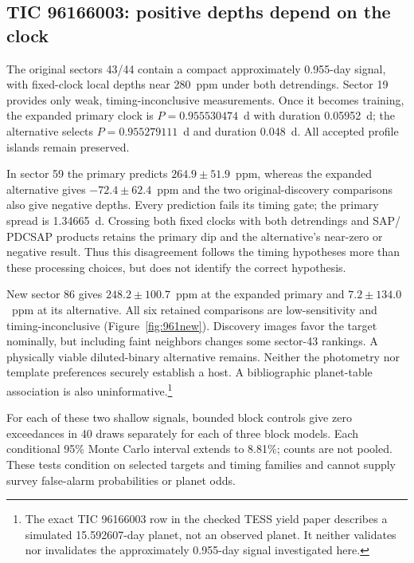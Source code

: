 \subsection{TIC 96166003: positive depths depend on the clock}
\label{sec:tic961}

The original sectors 43/44 contain a compact approximately 0.955-day signal,
with fixed-clock local depths near 280~ppm under both detrendings. Sector 19
provides only weak, timing-inconclusive measurements. Once it becomes training,
the expanded primary clock is $P=0.955530474$~d with duration 0.05952~d;
the alternative selects $P=0.955279111$~d and duration 0.048~d. All accepted
profile islands remain preserved.

In sector 59 the primary predicts $264.9\pm51.9$~ppm, whereas the expanded
alternative gives $-72.4\pm62.4$~ppm and the two original-discovery comparisons
also give negative depths. Every prediction fails its timing gate; the primary
spread is 1.34665~d. Crossing both fixed clocks with both detrendings and SAP/
PDCSAP products retains the primary dip and the alternative's near-zero or
negative result. Thus this disagreement follows the timing hypotheses more than
these processing choices, but does not identify the correct hypothesis.

New sector 86 gives $248.2\pm100.7$~ppm at the expanded primary and
$7.2\pm134.0$~ppm at its alternative. All six retained comparisons are
low-sensitivity and timing-inconclusive (Figure~\ref{fig:961new}). Discovery
images favor the target nominally, but including faint neighbors changes some
sector-43 rankings. A physically viable diluted-binary alternative remains.
Neither the photometry nor template preferences securely establish a host.
A bibliographic planet-table association is also uninformative.\footnote{The
exact TIC 96166003 row in the checked TESS yield paper describes a simulated
15.592607-day planet, not an observed planet. It neither validates nor
invalidates the approximately 0.955-day signal investigated here.}

For each of these two shallow signals, bounded block controls give zero
exceedances in 40 draws separately for each of three block models. Each
conditional 95\% Monte Carlo interval extends to 8.81\%; counts are not pooled.
These tests condition on selected targets and timing families and cannot supply
survey false-alarm probabilities or planet odds.


